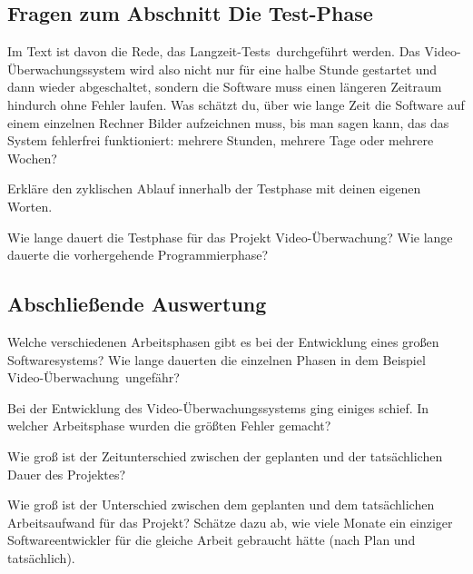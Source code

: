 \subsection*{Fragen zum Abschnitt \glqq Die Test-Phase\grqq}
\begin{compactenum}[a)]
\item Im Text ist davon die Rede, das \glqq Langzeit-Tests\grqq\ durchgeführt
werden. Das Video-Überwachungssystem wird also nicht nur für eine halbe Stunde
gestartet und dann wieder abgeschaltet, sondern die Software muss einen
längeren Zeitraum hindurch ohne Fehler laufen. Was schätzt du, über wie lange
Zeit die Software auf einem einzelnen Rechner Bilder aufzeichnen muss, bis man
sagen kann, das das System fehlerfrei funktioniert: mehrere Stunden, mehrere
Tage oder mehrere Wochen?
\item Erkläre den zyklischen Ablauf innerhalb der Testphase mit deinen eigenen
Worten.
\item Wie lange dauert die Testphase für das Projekt \glqq
Video-Überwachung\grqq ? Wie lange dauerte die vorhergehende Programmierphase?
\end{compactenum}

\subsection*{Abschließende Auswertung}
\begin{compactenum}[a)]
\item Welche verschiedenen Arbeitsphasen gibt es bei der Entwicklung eines
großen Softwaresystems? Wie lange dauerten die einzelnen Phasen in dem Beispiel
\glqq Video-Überwachung\grqq\ ungefähr?
\item Bei der Entwicklung des Video-Überwachungssystems ging einiges schief. In
welcher Arbeitsphase wurden die größten Fehler gemacht? 
\item Wie groß ist der Zeitunterschied zwischen der geplanten und der
tatsächlichen Dauer des Projektes? 
\item Wie groß ist der Unterschied zwischen dem geplanten und dem tatsächlichen
Arbeitsaufwand für das Projekt? Schätze dazu ab, wie viele Monate ein einziger
Softwareentwickler für die gleiche Arbeit gebraucht hätte (nach Plan und
tatsächlich).
\end{compactenum}

